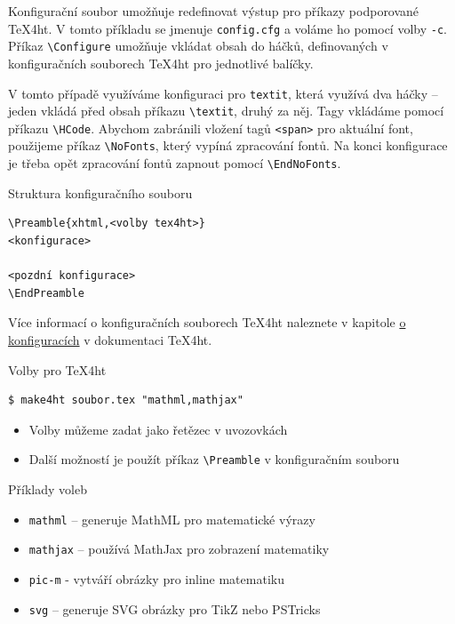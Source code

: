Konfigurační soubor  umožňuje redefinovat výstup
pro příkazy podporované \TeX4ht. V tomto příkladu
se jmenuje \texttt{config.cfg} a voláme ho pomocí volby \texttt{-c}.
Příkaz \verb|\Configure| umožňuje vkládat obsah do háčků, definovaných v 
konfiguračních souborech \TeX4ht pro jednotlivé balíčky. 

V tomto případě využíváme konfiguraci pro \texttt{textit}, která využívá
dva háčky -- jeden vkládá před obsah příkazu \verb|\textit|, druhý za něj.
Tagy vkládáme pomocí příkazu \verb|\HCode|. Abychom zabránili vložení tagů
\verb|<span>| pro aktuální font, použijeme příkaz \verb|\NoFonts|, který 
vypíná zpracování fontů. Na konci konfigurace je třeba opět zpracování fontů
zapnout pomocí \verb|\EndNoFonts|.

\begin{frame}[fragile]{Struktura konfiguračního souboru}
\begin{verbatim}
\Preamble{xhtml,<volby tex4ht>}
<konfigurace>

<pozdní konfigurace>
\EndPreamble
\end{verbatim}
\end{frame}

Více informací o konfiguračních souborech \TeX4ht naleznete v kapitole
\href{https://www.kodymirus.cz/tex4ht-doc/Configurations.html}{o konfiguracích}
v dokumentaci \TeX4ht.

\begin{frame}[fragile]{Volby pro \TeX4ht}

\begin{block}{}
\begin{verbatim}
$ make4ht soubor.tex "mathml,mathjax"
\end{verbatim}
\begin{itemize}
  \item Volby můžeme zadat jako řetězec v uvozovkách
  \item Další možností je použít příkaz \verb|\Preamble| v konfiguračním souboru
\end{itemize}
\end{block}

\begin{block}{Příklady voleb}
\begin{itemize}
  \item \texttt{mathml} – generuje MathML pro matematické výrazy
  \item \texttt{mathjax} – používá MathJax pro zobrazení matematiky
  \item \texttt{pic-m} - vytváří obrázky pro inline matematiku
  \item \texttt{svg} – generuje SVG obrázky pro TikZ nebo PSTricks
\end{itemize}
\end{block}
\end{frame}

